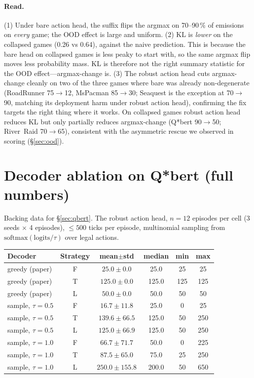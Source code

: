 \documentclass[11pt]{article}
\begin{document}
\paragraph{Read.}
(1) Under bare action head, the suffix flips the argmax on 70--90\,\% of emissions on \emph{every} game; the OOD effect is large and uniform. (2) KL is \emph{lower} on the collapsed games (0.26 vs 0.64), against the naive prediction. This is because the bare head on collapsed games is less peaky to start with, so the same argmax flip moves less probability mass. KL is therefore not the right summary statistic for the OOD effect---argmax-change is. (3) The robust action head cuts argmax-change cleanly on two of the three games where bare was already non-degenerate (RoadRunner 75$\to$12, MsPacman 85$\to$30; Seaquest is the exception at 70$\to$90, matching its deployment harm under robust action head), confirming the fix targets the right thing where it works. On collapsed games robust action head reduces KL but only partially reduces argmax-change (Q*bert 90$\to$50; River~Raid 70$\to$65), consistent with the asymmetric rescue we observed in scoring (\S\ref{sec:ood}).

\section{Decoder ablation on Q*bert (full numbers)}
\label{app:decoder}

Backing data for \S\ref{sec:qbert}. The robust action head, $n\!=\!12$ episodes per cell (3 seeds $\times$ 4 episodes), $\le\!500$ ticks per episode, multinomial sampling from $\mathrm{softmax}(\mathrm{logits}/\tau)$ over legal actions.

\smallskip\noindent
\begin{tabular}{lccccc}
\toprule
Decoder & Strategy & mean$\pm$std & median & min & max \\
\midrule
greedy (paper)     & F & $25.0\pm0.0$    & 25.0  & 25  & 25  \\
greedy (paper)     & T & $125.0\pm0.0$   & 125.0 & 125 & 125 \\
greedy (paper)     & L & $50.0\pm0.0$    & 50.0  & 50  & 50  \\
\midrule
sample, $\tau=0.5$ & F & $16.7\pm11.8$   & 25.0  &  0  & 25  \\
sample, $\tau=0.5$ & T & $139.6\pm66.5$  & 125.0 & 50  & 250 \\
sample, $\tau=0.5$ & L & $125.0\pm66.9$  & 125.0 & 50  & 250 \\
\midrule
sample, $\tau=1.0$ & F & $66.7\pm71.7$   & 50.0  &  0  & 225 \\
sample, $\tau=1.0$ & T & $87.5\pm65.0$   & 75.0  & 25  & 250 \\
sample, $\tau=1.0$ & L & $\mathbf{250.0\pm155.8}$ & 200.0 & 50  & 650 \\
\bottomrule
\end{tabular}\smallskip
\end{document}
